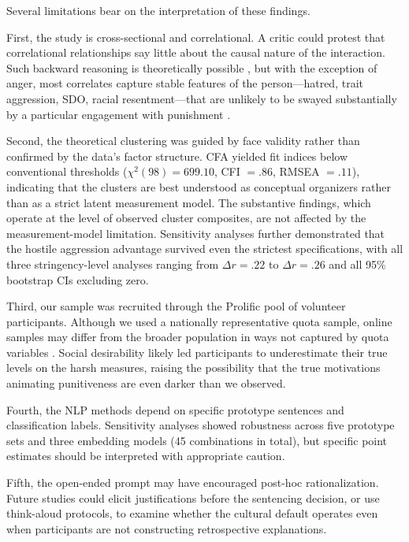 Several limitations bear on the interpretation of these findings.

First, the study is cross-sectional and correlational. A critic could protest that correlational relationships say little about the causal nature of the interaction. Such backward reasoning is theoretically possible \citep{HolyoakSimon1999, SimonRead2023}, but with the exception of anger, most correlates capture stable features of the person---hatred, trait aggression, SDO, racial resentment---that are unlikely to be swayed substantially by a particular engagement with punishment \citep{JuddKrosnick1982, Skitka2010}.

Second, the theoretical clustering was guided by face validity rather than confirmed by the data's factor structure. CFA yielded fit indices below conventional thresholds ($\chi^2(98) = 699.10$, CFI $= .86$, RMSEA $= .11$), indicating that the clusters are best understood as conceptual organizers rather than as a strict latent measurement model. The substantive findings, which operate at the level of observed cluster composites, are not affected by the measurement-model limitation. Sensitivity analyses further demonstrated that the hostile aggression advantage survived even the strictest specifications, with all three stringency-level analyses ranging from $\Delta r = .22$ to $\Delta r = .26$ and all 95\% bootstrap CIs excluding zero.

Third, our sample was recruited through the Prolific pool of volunteer participants. Although we used a nationally representative quota sample, online samples may differ from the broader population in ways not captured by quota variables \citep{ChandlerShapiro2016}. Social desirability \citep{Fisher1993} likely led participants to underestimate their true levels on the harsh measures, raising the possibility that the true motivations animating punitiveness are even darker than we observed.

Fourth, the NLP methods depend on specific prototype sentences and classification labels. Sensitivity analyses showed robustness across five prototype sets and three embedding models (45 combinations in total), but specific point estimates should be interpreted with appropriate caution.

Fifth, the open-ended prompt may have encouraged post-hoc rationalization. Future studies could elicit justifications before the sentencing decision, or use think-aloud protocols, to examine whether the cultural default operates even when participants are not constructing retrospective explanations.

